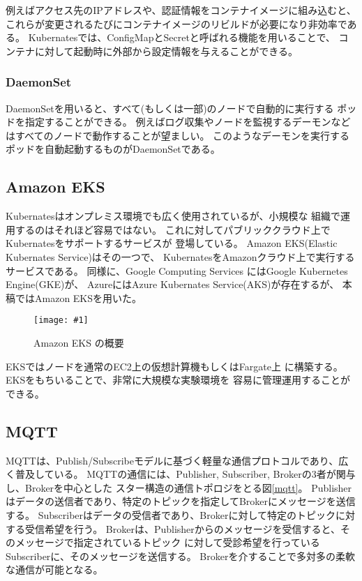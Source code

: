 \documentclass[submit,techrep]{ipsj}
\newcommand{\reffig}[1]{図\ref{#1}}
\newcommand{\epsfig}[4]{
\begin{figure}[tb]
  \begin{center}
    \texttt{[image: \#1]}
  \end{center}
  \caption{#3}
  \label{#4}
\end{figure}}
\newcommand{\kbs}{Kubernates}
\begin{document}
例えばアクセス先のIPアドレスや、認証情報をコンテナイメージに組み込むと、
これらが変更されるたびにコンテナイメージのリビルドが必要になり非効率である。
\kbs では、ConfigMapとSecretと呼ばれる機能を用いることで、
コンテナに対して起動時に外部から設定情報を与えることができる。


\subsubsection{DaemonSet}
DaemonSetを用いると、すべて(もしくは一部)のノードで自動的に実行する
ポッドを指定することができる。
例えばログ収集やノードを監視するデーモンなどはすべてのノードで動作することが望ましい。
このようなデーモンを実行するポッドを自動起動するものがDaemonSetである。



\subsection{Amazon EKS}
\kbs はオンプレミス環境でも広く使用されているが、小規模な
組織で運用するのはそれほど容易ではない。
これに対してパブリッククラウド上で\kbs をサポートするサービスが
登場している。
%
Amazon EKS(Elastic Kubernates Service)\cite{EKS}はその一つで、
KubernatesをAmazonクラウド上で実行するサービスである。
同様に、Google Computing Services にはGoogle Kubernetes Engine(GKE)\cite{gks}が、
AzureにはAzure Kubernates Service(AKS)\cite{aks}が存在するが、
本稿ではAmazon EKSを用いた。

\epsfig{figs/eks.pdf}{width=8.5cm}{Amazon EKS の概要}{eks}

EKSではノードを通常のEC2上の仮想計算機もしくはFargate\cite{fargate}上
に構築する。EKSをもちいることで、非常に大規模な実験環境を
容易に管理運用することができる。



\subsection{MQTT}
MQTT\cite{MQTT}は、Publish/Subscribeモデルに基づく軽量な通信プロトコルであり、広く普及している。
MQTTの通信には、Publisher, Subscriber, Brokerの3者が関与し、Brokerを中心とした
スター構造の通信トポロジをとる\reffig{mqtt}。
Publisherはデータの送信者であり、特定のトピックを指定してBrokerにメッセージを送信する。
Subscriberはデータの受信者であり、Brokerに対して特定のトピックに対する受信希望を行う。
Brokerは、Publisherからのメッセージを受信すると、そのメッセージで指定されているトピック
に対して受診希望を行っているSubscriberに、そのメッセージを送信する。
Brokerを介することで多対多の柔軟な通信が可能となる。
\end{document}
